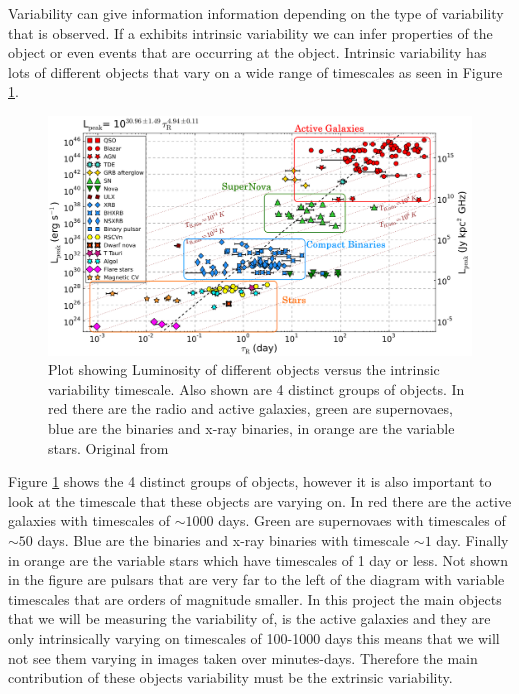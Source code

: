 \documentclass[a4paper, 10pt]{article}
\begin{document}
Variability can give information information depending on the type of variability that is observed. If a  exhibits intrinsic variability we can infer properties of the object or even events that are occurring at the object. Intrinsic variability has lots of different objects that vary on a wide range of timescales as seen in Figure \ref{intrinsic}.
\begin{figure}[H]
\begin{center}
	\includegraphics[width=\textwidth]{intrin3}
	\caption{Plot showing Luminosity of different objects versus the intrinsic variability timescale. Also shown are 4 distinct groups of objects. In red there are the radio and active galaxies, green are supernovaes, blue are the binaries and x-ray binaries, in orange are the variable stars. Original from \citet{Pietka}}
	\label{intrinsic}
\end{center}
\end{figure}
Figure \ref{intrinsic} shows the 4 distinct groups of objects, however it is also important to look at the timescale that these objects are varying on. In red there are the active galaxies with timescales of $\sim 1000$ days. Green are supernovaes with timescales of  $\sim 50$ days. Blue are the binaries and x-ray binaries with timescale  $\sim 1$ day. Finally in orange are the variable stars which have timescales of 1 day or less. Not shown in the figure are pulsars that are very far to the left of the diagram with variable timescales that are orders of magnitude smaller. In this project the main objects that we will be measuring the variability of, is the active galaxies and they are only intrinsically varying on timescales of 100-1000 days this means that we will not see them varying in images taken over minutes-days. Therefore the main contribution of these objects variability must be the extrinsic variability.\\
\end{document}
